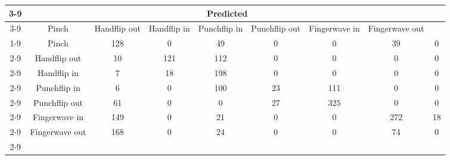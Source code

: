 \documentclass{standalone}
\begin{document}
 
 \begin{tabular}{|c |c |c |c |c |c |c |c |c |}
\cline{3-9}\multicolumn{2}{c|}{} & \multicolumn{7}{c|}{Predicted} \\ 
\cline{3-9} \multicolumn{2}{c |}{ } & Pinch & Handflip out & Handflip in & Punchflip in & Punchflip out & Fingerwave in & Fingerwave out\\ 
\cline{1-9}\multirow{7}{*}{\rotatebox[origin=c]{90}{Actual}} & Pinch & 128 & 0 & 49 & 0 & 0 & 39 & 0\\ 
 \cline{2-9} & Handflip out & 10 & 121 & 112 & 0 & 0 & 0 & 0\\ 
 \cline{2-9} & Handflip in & 7 & 18 & 198 & 0 & 0 & 0 & 0\\ 
 \cline{2-9} & Punchflip in & 6 & 0 & 100 & 23 & 111 & 0 & 0\\ 
 \cline{2-9} & Punchflip out & 61 & 0 & 0 & 27 & 325 & 0 & 0\\ 
 \cline{2-9} & Fingerwave in & 149 & 0 & 21 & 0 & 0 & 272 & 18\\ 
 \cline{2-9} & Fingerwave out & 168 & 0 & 24 & 0 & 0 & 74 & 0\\ 
 \cline{2-9}\hline \end{tabular}
 
\end{document}
